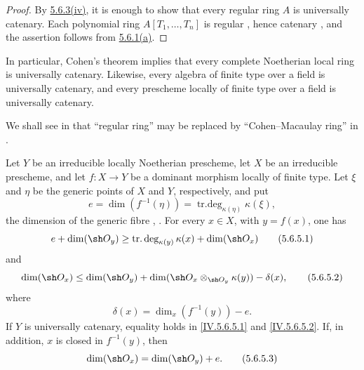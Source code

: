 \begin{proof}
By {\hyperlink{ega4.c04.sec.5-6-3-iv}{5.6.3\textup{(iv)}}}, it is enough to show
that every regular ring
$A$ is universally catenary.  Each polynomial ring
$A[T_1,\ldots,T_n]$ is regular , hence catenary
, and the assertion follows from
{\hyperlink{ega4.c04.sec.5-6-1-a}{5.6.1\textup{(a)}}}.
\end{proof}

In particular, Cohen's theorem  implies that every
complete Noetherian local ring is universally catenary.  Likewise,
every algebra of finite type over a field is universally catenary,
and every prescheme locally of finite type over a field is
universally catenary.

We shall see in  that ``regular ring'' may be replaced
by ``Cohen--Macaulay ring'' in .

\begin{proposition}[5.6.5]
\label{IV.5.6.5}
Let $Y$ be an irreducible locally Noetherian prescheme, let $X$ be
an irreducible prescheme, and let $f:X\to Y$ be a dominant morphism
locally of finite type.  Let $\xi$ and $\eta$ be the generic points
of $X$ and $Y$, respectively, and put
\[
e=\dim(f^{-1}(\eta))
  =\operatorname{tr.deg}_{\kappa(\eta)}\kappa(\xi),
\]
the dimension of the generic fibre
, .
For every $x\in X$, with $y=f(x)$, one has
\begin{equation}
e+\dim(\sh O_y)
 \geq \operatorname{tr.deg}_{\kappa(y)}\kappa(x)
       +\dim(\sh O_x)
\tag{5.6.5.1}\label{IV.5.6.5.1}
\end{equation}
and
\begin{equation}
\dim(\sh O_x)
 \leq \dim(\sh O_y)
      +\dim(\sh O_x\otimes_{\sh O_y}\kappa(y))
      -\delta(x),
\tag{5.6.5.2}\label{IV.5.6.5.2}
\end{equation}
where
\[
\delta(x)=\dim_x(f^{-1}(y))-e.
\]
If $Y$ is universally catenary, equality holds in
\eqref{IV.5.6.5.1} and \eqref{IV.5.6.5.2}.  If, in addition, $x$ is
closed in $f^{-1}(y)$, then
\begin{equation}
\dim(\sh O_x)=\dim(\sh O_y)+e.
\tag{5.6.5.3}\label{IV.5.6.5.3}
\end{equation}
\end{proposition}

